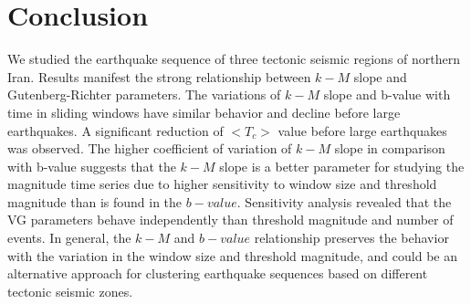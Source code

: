 
\section{Conclusion}
\noindent
We studied the earthquake sequence of three tectonic seismic regions of northern Iran. Results manifest the strong relationship between  $k-M$  slope and Gutenberg-Richter parameters. The variations of  $k-M$  slope and  b-value  with time in sliding windows have similar behavior and decline before large earthquakes. A significant reduction of  $<T_c>$  value before large earthquakes was observed. The higher coefficient of variation of  $k-M$  slope in comparison with  b-value  suggests that the  $k-M$  slope is a better parameter for studying the magnitude time series due to higher sensitivity to window size and threshold magnitude than  is found in the $b-value$. Sensitivity analysis revealed that the VG parameters behave independently than threshold magnitude and number of events. In general,  the $k-M$  and  $b-value$  relationship preserves the behavior with the variation in the window size and threshold magnitude, and could be an alternative approach for clustering earthquake sequences based on different tectonic seismic zones.